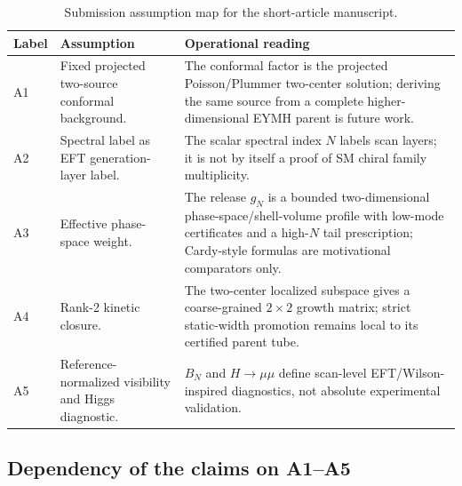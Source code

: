 \documentclass[pdflatex,sn-mathphys-num,iicol]{sn-jnl}
\begin{document}
\begin{table}[t]
\centering
\caption{Submission assumption map for the short-article manuscript.}
\label{tab:assumptions}
\small
\setlength{\tabcolsep}{4pt}
\renewcommand{\arraystretch}{1.12}
\begin{tabular}{@{}l l l@{}}
\toprule
\parbox[t]{0.11\textwidth}{\raggedright \textbf{Label}} & \parbox[t]{0.36\textwidth}{\raggedright \textbf{Assumption}} & \parbox[t]{0.40\textwidth}{\raggedright \textbf{Operational reading}} \\
\midrule
\parbox[t]{0.11\textwidth}{\raggedright A1} & \parbox[t]{0.36\textwidth}{\raggedright Fixed projected two-source conformal background.} & \parbox[t]{0.40\textwidth}{\raggedright The conformal factor is the projected Poisson/Plummer two-center solution; deriving the same source from a complete higher-dimensional EYMH parent is future work.} \\
\parbox[t]{0.11\textwidth}{\raggedright A2} & \parbox[t]{0.36\textwidth}{\raggedright Spectral label as EFT generation-layer label.} & \parbox[t]{0.40\textwidth}{\raggedright The scalar spectral index \(N\) labels scan layers; it is not by itself a proof of SM chiral family multiplicity.} \\
\parbox[t]{0.11\textwidth}{\raggedright A3} & \parbox[t]{0.36\textwidth}{\raggedright Effective phase-space weight.} & \parbox[t]{0.40\textwidth}{\raggedright The release \(g_N\) is a bounded two-dimensional phase-space/shell-volume profile with low-mode certificates and a high-\(N\) tail prescription; Cardy-style formulas are motivational comparators only.} \\
\parbox[t]{0.11\textwidth}{\raggedright A4} & \parbox[t]{0.36\textwidth}{\raggedright Rank-2 kinetic closure.} & \parbox[t]{0.40\textwidth}{\raggedright The two-center localized subspace gives a coarse-grained \(2\times2\) growth matrix; strict static-width promotion remains local to its certified parent tube.} \\
\parbox[t]{0.11\textwidth}{\raggedright A5} & \parbox[t]{0.36\textwidth}{\raggedright Reference-normalized visibility and Higgs diagnostic.} & \parbox[t]{0.40\textwidth}{\raggedright \(B_N\) and \(H\to\mu\mu\) define scan-level EFT/Wilson-inspired diagnostics, not absolute experimental validation.} \\
\bottomrule
\end{tabular}
\end{table}

\subsection{Dependency of the claims on A1--A5}
\end{document}
